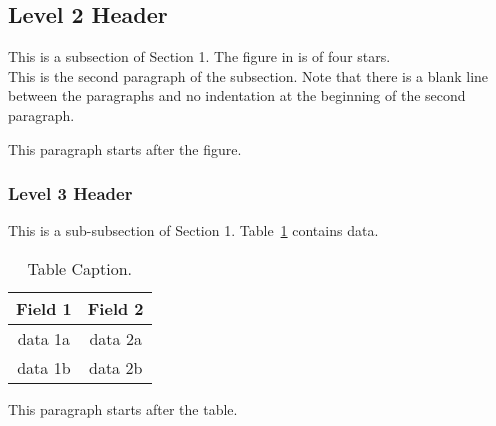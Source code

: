 \documentclass[12pt]{article}
\begin{document}
\subsection{Level 2 Header}

This is a subsection of Section 1.   The figure in %
is of four stars.\\

This is the second paragraph of the subsection.  Note that there is a blank line between the paragraphs and
no indentation at the beginning of the second paragraph. 
 

This paragraph starts after the figure.

\subsubsection{Level 3 Header}

This is a sub-subsection of Section 1.  Table~\ref{table1} contains data.

\begin{table}[hbt]
\begin{center}
\begin{tabular}{|c|c|} \hline
Field 1 & Field 2\\ \hline
data 1a   & data 2a\\ \hline
data 1b &  data 2b \\ \hline
\end{tabular}
\end{center}
\caption{Table Caption.}
\label{table1} 
\end{table}

This paragraph starts after the table.
 


\end{document}
